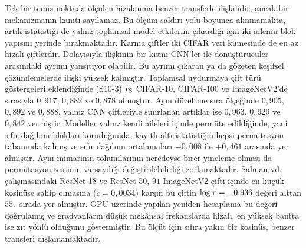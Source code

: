 Tek bir temiz noktada ölçülen hizalanma benzer transferle ilişkilidir, ancak bir mekanizmanın kanıtı sayılamaz. Bu ölçüm saldırı yolu boyunca alınmamakta, artık istatistiği de yalnız toplamsal model etkilerini çıkardığı için iki ailenin blok yapısını yerinde bırakmaktadır. Karma çiftler iki CIFAR veri kümesinde de en az hizalı çiftlerdir. Dolayısıyla ilişkinin bir kısmı CNN'ler ile dönüştürücüler arasındaki ayrımı yansıtıyor olabilir. Bu ayrımı çıkaran ya da gözeten keşifsel çözümlemelerde ilişki yüksek kalmıştır. Toplamsal uydurmaya çift türü göstergeleri eklendiğinde (S10-3) $r_{\mathrm{S}}$ CIFAR-10, CIFAR-100 ve ImageNetV2'de sırasıyla $0{,}917$, $0{,}882$ ve $0{,}878$ olmuştur. Aynı düzeltme sıra ölçeğinde $0{,}905$, $0{,}892$ ve $0{,}888$, yalnız CNN çiftleriyle sınırlanan artıklar ise $0{,}963$, $0{,}929$ ve $0{,}842$ vermiştir. Modeller yalnız kendi aileleri içinde permüte edildiğinde, yani sıfır dağılımı blokları koruduğunda, kayıtlı altı istatistiğin hepsi permütasyon tabanında kalmış ve sıfır dağılımı ortalamaları $-0{,}008$ ile $+0{,}461$ arasında yer almıştır. Aynı mimarinin tohumlarının neredeyse birer yineleme olması da permütasyon testinin varsaydığı değiştirilebilirliği zorlamaktadır. Salman vd.~\cite{salman2020adversarially} çalışmasındaki ResNet-18 ve ResNet-50, $91$ ImageNetV2 çifti içinde en küçük kosinüse sahip olmasına ($c = 0{,}0034$) karşın bu çiftin $\log\bar{\tau} = -0{,}936$ değeri alttan $55$.\ sırada yer almıştır. GPU üzerinde yapılan yeniden hesaplama bu değeri doğrulamış ve gradyanların düşük mekânsal frekanslarda hizalı, en yüksek bantta ise zıt yönlü olduğunu göstermiştir. Bu ölçüt için sıfıra yakın bir kosinüs, benzer transferi dışlamamaktadır.

